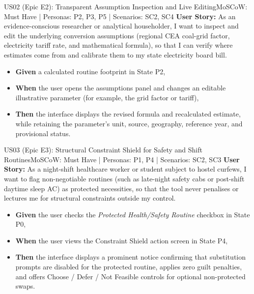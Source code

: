 \documentclass[12pt, a4paper]{article}
\begin{document}
\begin{storybox}{US02 (Epic E2): Transparent Assumption Inspection and Live Editing}{MoSCoW: Must Have | Personas: P2, P3, P5 | Scenarios: SC2, SC4}
\textbf{User Story:} As an evidence-conscious researcher or analytical householder, I want to inspect and edit the underlying conversion assumptions (regional CEA coal-grid factor, electricity tariff rate, and mathematical formula), so that I can verify where estimates come from and calibrate them to my state electricity board bill.
\begin{itemize}
    \item \textbf{Given} a calculated routine footprint in State P2,
    \item \textbf{When} the user opens the assumptions panel and changes an editable illustrative parameter (for example, the grid factor or tariff),
    \item \textbf{Then} the interface displays the revised formula and recalculated estimate, while retaining the parameter's unit, source, geography, reference year, and provisional status.
\end{itemize}
\end{storybox}

\begin{storybox}{US03 (Epic E3): Structural Constraint Shield for Safety and Shift Routines}{MoSCoW: Must Have | Personas: P1, P4 | Scenarios: SC2, SC3}
\textbf{User Story:} As a night-shift healthcare worker or student subject to hostel curfews, I want to flag non-negotiable routines (such as late-night safety cabs or post-shift daytime sleep AC) as protected necessities, so that the tool never penalises or lectures me for structural constraints outside my control.
\begin{itemize}
    \item \textbf{Given} the user checks the \textit{Protected Health/Safety Routine} checkbox in State P0,
    \item \textbf{When} the user views the Constraint Shield action screen in State P4,
    \item \textbf{Then} the interface displays a prominent notice confirming that substitution prompts are disabled for the protected routine, applies zero guilt penalties, and offers Choose / Defer / Not Feasible controls for optional non-protected swaps.
\end{itemize}
\end{storybox}
\end{document}
